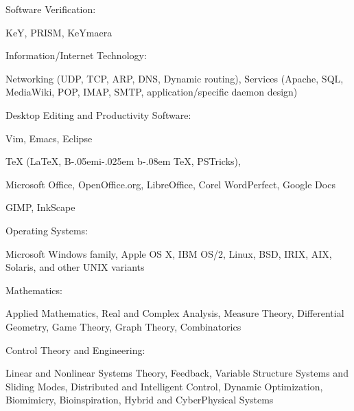 \documentclass[10pt]{article}
\newcommand{\halfblankline}{\quad\vspace{-0.5\baselineskip}\pagebreak[3]}
\providecommand\BibTeX{{B\kern-.05em{\sc i\kern-.025em b}\kern-.08em \TeX}}
\begin{document}
\halfblankline

Software Verification:
%
\begin{innerlist}
    \item KeY, PRISM, KeYmaera
\end{innerlist}

\halfblankline

Information/Internet Technology:
%
\begin{innerlist}
    \item Networking (UDP, TCP, ARP, DNS, Dynamic
        routing), Services (Apache, SQL, MediaWiki, POP, IMAP, SMTP,
        application\-/specific daemon design)
\end{innerlist}

\halfblankline

Desktop Editing and Productivity Software:
%
\begin{innerlist}
    \item Vim, Emacs, Eclipse
    \item \TeX{} (\LaTeX{}, \BibTeX{}, PSTricks),
    \item Microsoft Office, OpenOffice.org, LibreOffice, Corel
        WordPerfect, Google Docs
    \item GIMP, InkScape
\end{innerlist}

\halfblankline

Operating Systems:
%
\begin{innerlist}
    \item Microsoft Windows family, Apple OS X, IBM OS/2, Linux, BSD,
        IRIX, AIX, Solaris, and other UNIX variants
\end{innerlist}

Mathematics:
%
\begin{innerlist}
    \item Applied Mathematics, Real and Complex Analysis, Measure
        Theory, Differential Geometry, Game Theory, Graph Theory,
        Combinatorics
\end{innerlist}

\halfblankline

Control Theory and Engineering:
%
\begin{innerlist}
    \item Linear and Nonlinear Systems Theory, Feedback, Variable
        Structure Systems and Sliding Modes, Distributed and Intelligent
        Control, Dynamic Optimization, Biomimicry, Bioinspiration,
        Hybrid and CyberPhysical Systems
\end{innerlist}
\end{document}
